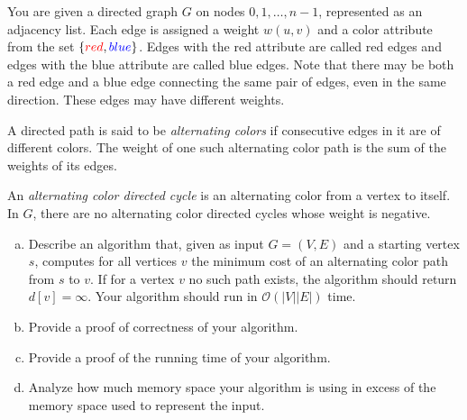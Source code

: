 \documentclass{cs0500}
\begin{document}
\begin{problem}
You are given a directed graph $G$ on nodes $0,1,\dots,n-1$, represented as an adjacency list. Each edge is assigned a weight $w(u,v)$ and a color attribute from the set $\{{\color{red} red}, {\color{blue} blue}\}$. 
Edges with the {\color{red} red} attribute are called {\color{red} red edges} and edges with the {\color{blue} blue} attribute are called {\color{blue} blue edges}.
Note that there may be both a {\color{red} red edge} and a {\color{blue} blue edge} connecting the same pair of edges, even in the same direction. These edges may have different weights.

A directed path is said to be \emph{alternating colors} if consecutive edges in it are of different colors. The weight of one such alternating color path is the sum of the weights of its edges.

An \emph{alternating color directed cycle} is an alternating color from a vertex to itself. In $G$, there are no alternating color directed cycles whose weight is negative.
\begin{enumerate}[(a)]
    \item Describe an algorithm that, given as input $G=(V,E)$ and a starting vertex $s$, computes for all vertices $v$ the minimum cost of an alternating color path from $s$ to $v$. If for a vertex $v$ no such path exists, the algorithm should return $d[v]=\infty$. Your algorithm should run in $\mathcal{O}(|V||E|)$ time.
    \item Provide a proof of correctness of your algorithm.
    \item Provide a proof of the running time of your algorithm.
    \item Analyze how much memory space your algorithm is using in excess of the memory space used to represent the input. 
\end{enumerate}

\end{problem}

\begin{solution}
\end{solution}
\end{document}
